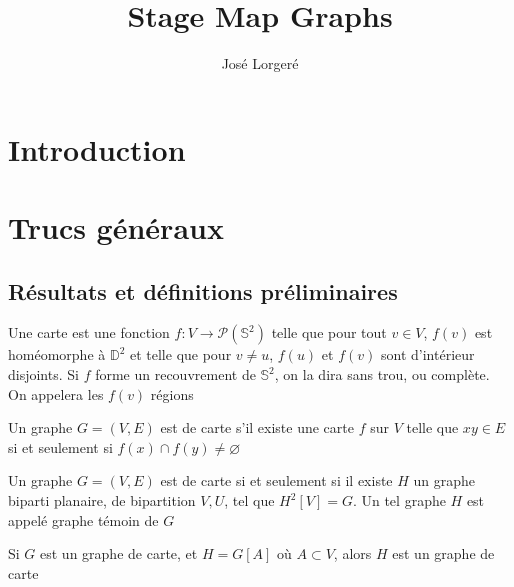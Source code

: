 \documentclass{scrartcl}
\begin{document}
\title{Stage Map Graphs}

\author{José Lorgeré}

\maketitle

\begin{flushleft}

\section*{Introduction}

\section{Trucs généraux}

\subsection{Résultats et définitions préliminaires}

\begin{def*}[Carte]
    Une carte est une fonction $f : V \rightarrow \mathcal{P}(\mathbb{S}^2)$ telle que pour tout $v \in V$, $f(v)$
    est homéomorphe à $\mathbb{D}^2$ et telle que pour $v \neq u$, $f(u)$ et $f(v)$ sont d'intérieur disjoints. Si
    $f$ forme un recouvrement de $\mathbb{S}^2$, on la dira sans trou, ou complète. On appelera les $f(v)$ régions
\end{def*}

\begin{def*}
    Un graphe $G = (V, E)$ est de carte s'il existe une carte $f$ sur $V$ telle que $xy \in E$ si et seulement si
    $f(x) \cap f(y) \neq \varnothing$
\end{def*}

\begin{theorem}\label{carCarte}
    Un graphe $G = (V, E)$ est de carte si et seulement si il existe $H$ un graphe biparti planaire, de bipartition $V, U$,
    tel que $H^2[V] = G$. Un tel graphe $H$ est appelé graphe témoin de $G$
\end{theorem}

\begin{prop}
    Si $G$ est un graphe de carte, et $H = G[A]$ où $A \subset V$, alors $H$ est un graphe de carte
\end{prop}


\end{flushleft}
\end{document}
